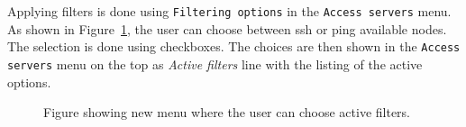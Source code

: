 {{{{\begin{table}[htb]
\centering
\caption{Structure and examples of availability table for filtering functionality.}
\label{table:availability}
\end{table}

Applying filters is done using \texttt{Filtering options} in the \texttt{Access servers} menu. As shown in Figure~\ref{fig:filtering}, the user can choose between ssh or ping available nodes. The selection is done using checkboxes. The choices are then shown in the \texttt{Access servers} menu on the top as \textit{Active filters} line with the listing of the active options. \\

\begin{figure}[H]
	\centering
	\caption{Figure showing new menu where the user can choose active filters.}
	\label{fig:filtering}
\end{figure}

}}}}
